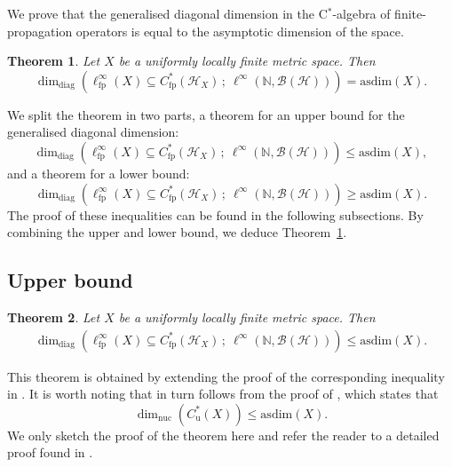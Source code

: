 \documentclass[a4paper]{amsart}
\newcommand{\myhyp}{\textnormal{-}\hskip0pt\relax}
\numberwithin{equation}{section}
\newcommand{\N}{\mathbb{N}}
\newcommand{\Bcal}{\mathcal{B}}
\newcommand{\Hcal}{\mathcal{H}}
\newcommand{\cstar}{C$^\ast$\myhyp{}algebra}
\newcommand{\bop}[1]{\Bcal({#1})}
\newcommand{\Cu}[1]{C^{\ast}_{\mathrm{u}}({#1})}
\newcommand{\Cfp}[1]{C^{\ast}_{\mathrm{fp}}({#1})}
\newcommand{\CfpCartan}[1]{\ell^{\infty}_{\mathrm{fp}}({#1})}
\newcommand{\dimnuc}[1]{\dim_{\mathrm{nuc}}({#1})}
\newcommand{\ddimn}[3]{\dim_{\mathrm{diag}}({#1}\subseteq{#2}\, ;~{#3})}
\newcommand{\asdim}[1]{\mathrm{asdim}({#1})}
\theoremstyle{plain}
\newtheorem{thm}{Theorem}[section]
\theoremstyle{indented}
\numberwithin{equation}{section}
\theoremstyle{definition}
\theoremstyle{remark}
\theoremstyle{plain}
\theoremstyle{definition}
\begin{document}
\smallskip

We prove that the generalised diagonal dimension in the \cstar{} of finite\myhyp{}propagation operators is equal to the asymptotic dimension of the space.

\begin{thm} \label{cor:diagDimFPAlg}
     Let $X$ be a uniformly locally finite metric space. 
     Then
    \begin{equation*}
         \ddimn{\CfpCartan{X}}{\Cfp{\Hcal_X}}{\ell^\infty(\N, \bop{\Hcal})} = \asdim{X}.
    \end{equation*}
\end{thm}

We split the theorem in two parts, a theorem for an upper bound for the generalised diagonal dimension:
\begin{equation*}
         \ddimn{\CfpCartan{X}}{\Cfp{\Hcal_X}}{\ell^\infty(\N, \bop{\Hcal})} \le \asdim{X},
\end{equation*}
and a theorem for a lower bound:
\begin{equation*}
         \ddimn{\CfpCartan{X}}{\Cfp{\Hcal_X}}{\ell^\infty(\N, \bop{\Hcal})} \ge \asdim{X}.
\end{equation*}
The proof of these inequalities can be found in the following subsections. By combining the upper and lower bound, we deduce Theorem~\ref{cor:diagDimFPAlg}.


\medskip
\subsection{Upper bound}

\begin{thm} \label{thm:upperBoundFPAlg}
    Let $X$ be a uniformly locally finite metric space.
    Then
    \begin{align*}
         \ddimn{\CfpCartan{X}}{\Cfp{\Hcal_X}}{\ell^\infty(\N, \bop{\Hcal})} \le \asdim{X}.
    \end{align*}
\end{thm}

This theorem is obtained by extending the proof of the corresponding inequality in \cite[Theorem~7.7]{LiLiaoWinter2023diagDim}. 
It is worth noting that \cite[Theorem~7.7]{LiLiaoWinter2023diagDim} in turn follows from the proof of \cite[Theorem~8.5]{WinterZacharias2010nucDim}, which states that
\begin{equation*}
    \dimnuc{\Cu{X}} \le \asdim{X}.
\end{equation*}
We only sketch the proof of the theorem here and refer the reader to a detailed proof found in \cite[Theorem~5.2]{Kitsios2025PhDThesis}.
\end{document}

